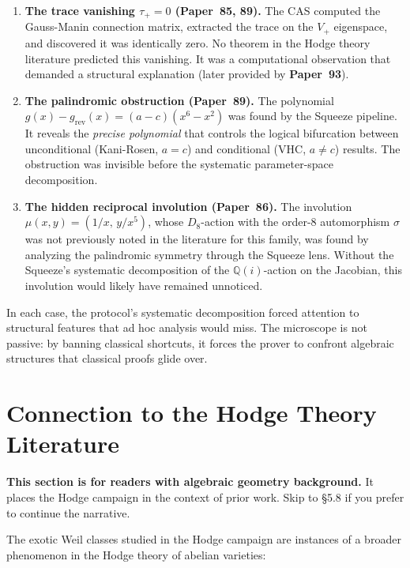 \documentclass[11pt,twoside,openany]{report}
\theoremstyle{remark}
\newcommand{\paperref}[1]{\textbf{Paper~#1}}
\begin{document}
\begin{enumerate}
  \item \textbf{The trace vanishing $\tau_+ = 0$ (\paperref{85, 89}).} The CAS computed the Gauss-Manin connection matrix, extracted the trace on the $V_+$ eigenspace, and discovered it was identically zero. No theorem in the Hodge theory literature predicted this vanishing. It was a computational observation that demanded a structural explanation (later provided by \paperref{93}).

  \item \textbf{The palindromic obstruction (\paperref{89}).} The polynomial $g(x) - g_{\mathrm{rev}}(x) = (a - c)(x^6 - x^2)$ was found by the Squeeze pipeline. It reveals the \emph{precise polynomial} that controls the logical bifurcation between unconditional (Kani-Rosen, $a = c$) and conditional (VHC, $a \neq c$) results. The obstruction was invisible before the systematic parameter-space decomposition.

  \item \textbf{The hidden reciprocal involution (\paperref{86}).} The involution $\mu(x,y) = (1/x,\, y/x^5)$, whose $D_8$-action with the order-8 automorphism $\sigma$ was not previously noted in the literature for this family, was found by analyzing the palindromic symmetry through the Squeeze lens. Without the Squeeze's systematic decomposition of the $\mathbb{Q}(i)$-action on the Jacobian, this involution would likely have remained unnoticed.
\end{enumerate}

In each case, the protocol's systematic decomposition forced attention to structural features that ad hoc analysis would miss. The microscope is not passive: by banning classical shortcuts, it forces the prover to confront algebraic structures that classical proofs glide over.


\section{Connection to the Hodge Theory Literature}

\textbf{This section is for readers with algebraic geometry background.} It places the Hodge campaign in the context of prior work. Skip to \S5.8 if you prefer to continue the narrative.

The exotic Weil classes studied in the Hodge campaign are instances of a broader phenomenon in the Hodge theory of abelian varieties:
\end{document}
